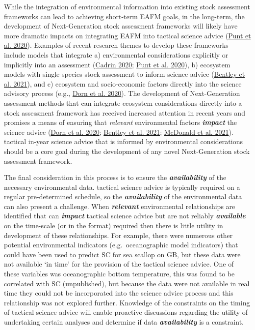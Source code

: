 \documentclass[
]{article}
\begin{document}
While the integration of environmental information into existing stock assessment frameworks can lead to achieving short-term EAFM goals, in the long-term, the development of Next-Generation stock assessment frameworks will likely have more dramatic impacts on integrating EAFM into tactical science advice (\protect\hyperlink{ref-puntEssentialFeaturesNextgeneration2020}{Punt et al. 2020}). Examples of recent research themes to develop these frameworks include models that integrate a) environmental considerations explicitly or implicitly into an assessment (\protect\hyperlink{ref-cadrinDefiningSpatialStructure2020}{Cadrin 2020}; \protect\hyperlink{ref-puntEssentialFeaturesNextgeneration2020}{Punt et al. 2020}), b) ecosystem models with single species stock assessment to inform science advice (\protect\hyperlink{ref-bentleyRefiningFisheriesAdvice2021}{Bentley et al. 2021}), and c) ecosystem and socio-economic factors directly into the science advisory process (e.g., \protect\hyperlink{ref-dornAssessmentWalleyePollock2020}{Dorn et al. 2020}). The development of Next-Generation assessment methods that can integrate ecosystem considerations directly into a stock assessment framework has received increased attention in recent years and promises a means of ensuring that \emph{relevant} environmental factors \textbf{\emph{impact}} the science advice (\protect\hyperlink{ref-dornAssessmentWalleyePollock2020}{Dorn et al. 2020}; \protect\hyperlink{ref-bentleyRefiningFisheriesAdvice2021}{Bentley et al. 2021}; \protect\hyperlink{ref-mcdonaldExplicitIncorporationSpatial2021}{McDonald et al. 2021}). tactical in-year science advice that is informed by environmental considerations should be a core goal during the development of any novel Next-Generation stock assessment framework.

The final consideration in this process is to ensure the \textbf{\emph{availability}} of the necessary environmental data. tactical science advice is typically required on a regular pre-determined schedule, so the \textbf{\emph{availability}} of the environmental data can also present a challenge. When \textbf{\emph{relevant}} environmental relationships are identified that can \textbf{\emph{impact}} tactical science advice but are not reliably \textbf{\emph{available}} on the time-scale (or in the format) required then there is little utility in development of these relationships. For example, there were numerous other potential environmental indicators (e.g.~oceanographic model indicators) that could have been used to predict SC for sea scallop on GB, but these data were not available `in time' for the provision of the tactical science advice. One of these variables was oceanographic bottom temperature, this was found to be correlated with SC (unpublished), but because the data were not available in real time they could not be incorporated into the science advice process and this relationship was not explored further. Knowledge of the constraints on the timing of tactical science advice will enable proactive discussions regarding the utility of undertaking certain analyses and determine if data \textbf{\emph{availability}} is a constraint.
\end{document}
